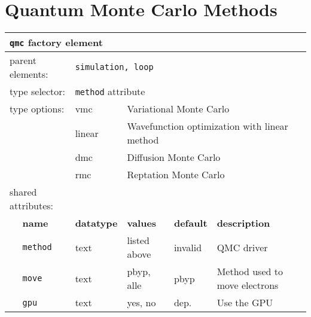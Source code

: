 \chapter{Quantum Monte Carlo Methods}
\label{chap:qmcmethods}

\begin{table}[h]
\begin{center}
\begin{tabularx}{\linewidth}{l l l l l X }
\hline
\multicolumn{6}{l}{\texttt{qmc} factory element} \\
\hline
\multicolumn{2}{l}{parent elements:} & \multicolumn{4}{l}{\texttt{simulation, loop}}\\
\multicolumn{2}{l}{type   selector:} & \multicolumn{4}{l}{\texttt{method} attribute}\\
\multicolumn{2}{l}{type   options: } & vmc           & \multicolumn{3}{l}{Variational Monte Carlo}\\
\multicolumn{2}{l}{                } & linear        & \multicolumn{3}{l}{Wavefunction optimization with linear method}\\
\multicolumn{2}{l}{                } & dmc           & \multicolumn{3}{l}{Diffusion Monte Carlo}\\
\multicolumn{2}{l}{                } & rmc           & \multicolumn{3}{l}{Reptation Monte Carlo}\\
\multicolumn{2}{l}{shared attributes:} & \multicolumn{4}{l}{}\\
   &   \bfseries name         & \bfseries datatype & \bfseries values & \bfseries default & \bfseries description \\
   &   \texttt{method}        &  text              &   listed above   & invalid           & QMC driver            \\
   &   \texttt{move}          &  text              &   pbyp, alle     & pbyp              & Method used to move electrons \\
   &   \texttt{gpu}           &  text              &   yes, no        & dep.              & Use the GPU\\

\end{tabularx}
\end{center}
\end{table}
